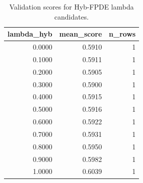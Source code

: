 \begin{table}[t]
\caption{Validation scores for Hyb-FPDE lambda candidates.}
\label{tab:lambda_distribution_computed}
\centering
\begin{tabular}{rrr}
\toprule
lambda\_hyb & mean\_score & n\_rows \\
\midrule
0.0000 & 0.5910 & 1 \\
0.1000 & 0.5911 & 1 \\
0.2000 & 0.5905 & 1 \\
0.3000 & 0.5900 & 1 \\
0.4000 & 0.5915 & 1 \\
0.5000 & 0.5916 & 1 \\
0.6000 & 0.5922 & 1 \\
0.7000 & 0.5931 & 1 \\
0.8000 & 0.5950 & 1 \\
0.9000 & 0.5982 & 1 \\
1.0000 & 0.6039 & 1 \\
\bottomrule
\end{tabular}

\end{table}
